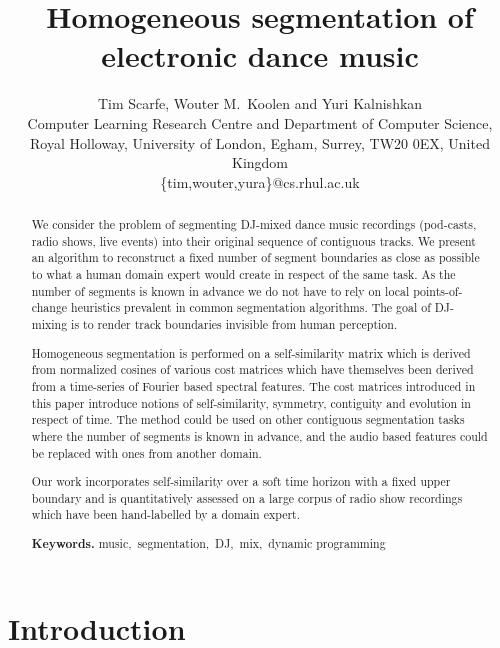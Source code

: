 \documentclass[twocolumn]{article}
\author{Tim Scarfe, Wouter M.~Koolen and Yuri Kalnishkan \\ 
	Computer Learning Research
	Centre and Department of Computer Science, \\ 
	Royal Holloway,  University of London, Egham, Surrey, TW20 0EX, United Kingdom\\
	\{tim,wouter,yura\}@cs.rhul.ac.uk
}
\title{Homogeneous segmentation of electronic dance music}
\begin{document}
	
	\maketitle
	
	\begin{abstract}
		
		We consider the problem of segmenting DJ-mixed dance music recordings (pod-casts, radio shows, live events) into their original sequence of contiguous tracks. We present an algorithm to reconstruct a fixed number of segment boundaries as close as possible to what a human domain expert would create in respect of the same task. As the number of segments is known in advance we do not have to rely on local points-of-change heuristics prevalent in common segmentation algorithms. The goal of DJ-mixing is to render track boundaries  invisible from human perception.
		
		Homogeneous segmentation is performed on a self-similarity matrix which is derived from normalized cosines of various cost matrices which have themselves been derived from a time-series of Fourier based spectral features. The cost matrices introduced in this paper introduce notions of self-similarity, symmetry, contiguity and evolution in respect of time. The method could be used on other contiguous segmentation tasks where the number of segments is known in advance, and the audio based features could be replaced with ones from another domain.
		
		Our work incorporates self-similarity over a soft time horizon with a fixed upper boundary and is quantitatively assessed on a large corpus of radio show recordings which have been hand-labelled by a domain expert.
		\smallskip
		
		\noindent \textbf{Keywords.} \noindent music,~segmentation,~DJ,~mix,~dynamic programming
		
	\end{abstract}
	
	
	\vspace{1em}
	
	\section{Introduction}
	
\end{document}
